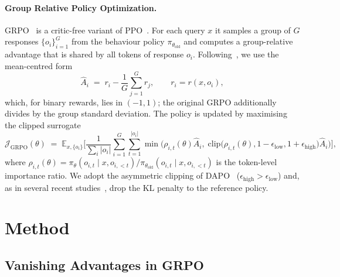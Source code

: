 \documentclass{article}
\begin{document}
\paragraph{Group Relative Policy Optimization.} GRPO~\citep{deepseek-r1} is a critic-free variant of PPO~\citep{ppo}. For each query $x$ it samples a group of $G$ responses $\{o_i\}_{i=1}^G$ from the behaviour policy $\pi_{\theta_\mathrm{old}}$ and computes a group-relative advantage that is shared by all tokens of response $o_i$. Following~\citet{drgrpo}, we use the mean-centred form
\begin{equation}
\hat{A}_i \;=\; r_i - \frac{1}{G}\sum_{j=1}^{G} r_j, \qquad r_i = r(x,o_i),
\label{eq:adv}
\end{equation}
which, for binary rewards, lies in $(-1,1)$; the original GRPO additionally divides by the group standard deviation. The policy is updated by maximising the clipped surrogate
\begin{equation}
\mathcal{J}_{\mathrm{GRPO}}(\theta) \;=\; \mathbb{E}_{x,\{o_i\}}\Bigg[\frac{1}{\sum_i |o_i|}\sum_{i=1}^{G}\sum_{t=1}^{|o_i|} \min\Big(\rho_{i,t}(\theta)\hat{A}_i,\; \mathrm{clip}\big(\rho_{i,t}(\theta),1-\epsilon_\mathrm{low},1+\epsilon_\mathrm{high}\big)\hat{A}_i\Big)\Bigg],
\label{eq:grpo}
\end{equation}
where $\rho_{i,t}(\theta)=\pi_\theta(o_{i,t}\mid x,o_{i,<t})/\pi_{\theta_\mathrm{old}}(o_{i,t}\mid x,o_{i,<t})$ is the token-level importance ratio. We adopt the asymmetric clipping of DAPO~\citep{dapo} ($\epsilon_\mathrm{high}>\epsilon_\mathrm{low}$) and, as in several recent studies~\citep{dapo,open-reasoner-zero}, drop the KL penalty to the reference policy.

\section{Method}
\label{sec:method}

\subsection{Vanishing Advantages in GRPO}
\label{sec:vanishing}
\end{document}
